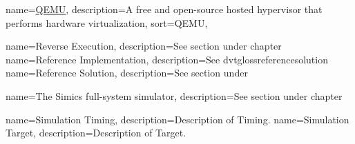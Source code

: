 {
  name=\href{http://en.wikipedia.org/wiki/QEMU}{QEMU},
  description={A free and open-source hosted hypervisor that performs hardware virtualization},
  sort={QEMU},
}
\newcommand{\dvttermqemu}{\glslink{dvtglossqemu}{QEMU}} %

{
  name=Reverse Execution,
  description={See section  under chapter }
}
\newcommand{\dvttermreverseexecution}{\dvtcmdcaponcegloss{dvtglossreverseexecution}{Reverse Execution}}
{
  name=Reference Implementation,
  description={See \gls{dvtglossreferencesolution}}
}
\newcommand{\dvttermreferenceimplementation}{\dvtcmdcaponcegloss{dvtglossreferenceimplementation}{Reference Implementation}}
{
  name=Reference Solution,
  description={See section  under }
}
\newcommand{\dvttermreferencesolution}{\dvtcmdcaponcegloss{dvtglossreferencesolution}{Reference Solution}}

\newcommand{\dvttermsoftwarerendering}{\dvtcmdcaponce{Software Rendering}}
{
  name=The Simics full-system simulator,
  description={See section  under chapter }
}
\newcommand{\dvttermsimics}{\glslink{dvtglosssimics}{Simics}}
\newcommand{\dvttermsics}{\dvtcmdabbrev{dvtglosssics}}
\newcommand{\dvttermsunmicrosystems}{Sun Microsystems, Inc.}
\newcommand{\dvttermsimd}{\dvtcmdabbrev{dvtglosssimd}}

\newcommand{\dvttermttm}{\dvtcmdabbrev{dvtglossttm}}
{
  name=Simulation Timing,
  description={Description of Timing.}
}
\newcommand{\dvttermtiming}{\dvtcmdcaponcegloss{dvtglosstiming}{Timing}}
{
  name=Simulation Target,
  description={Description of Target.}
}
\newcommand{\dvttermtarget}{\dvtcmdcaponcegloss{dvtglosstarget}{Target}}

